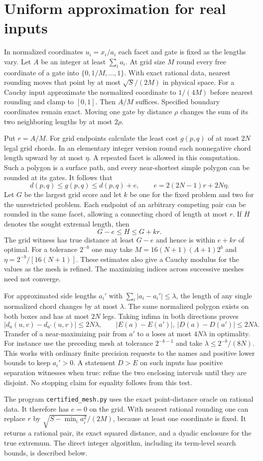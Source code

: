 \documentclass[10pt,letterpaper]{article}
\begin{document}
\section{Uniform approximation for real inputs}\label{sec:precision}
In normalized coordinates $u_i=x_i/a_i$ each facet and gate is fixed as the lengths vary. Let $A$ be an integer at least $\sum_i a_i$. At grid size $M$ round every free coordinate of a gate into $\{0,1/M,\ldots,1\}$. With exact rational data, nearest rounding moves that point by at most $\sqrt S/(2M)$ in physical space. For a Cauchy input approximate the normalized coordinate to $1/(4M)$ before nearest rounding and clamp to $[0,1]$. Then $A/M$ suffices. Specified boundary coordinates remain exact. Moving one gate by distance $\rho$ changes the sum of its two neighboring lengths by at most $2\rho$.
\par Put $r=A/M$. For grid endpoints calculate the least cost $g(p,q)$ of at most $2N$ legal grid chords. In an elementary integer version round each nonnegative chord length upward by at most $\eta$. A repeated facet is allowed in this computation. Such a polygon is a surface path, and every near-shortest simple polygon can be rounded at its gates. It follows that
\[
 d(p,q)\le g(p,q)\le d(p,q)+e,\qquad e=2(2N-1)r+2N\eta .
\]
Let $G$ be the largest grid score and let $k$ be one for the fixed problem and two for the unrestricted problem. Each endpoint of an arbitrary competing pair can be rounded in the same facet, allowing a connecting chord of length at most $r$. If $H$ denotes the sought extremal length, then
\[
             G-e\le H\le G+kr.
\]
The grid witness has true distance at least $G-e$ and hence is within $e+kr$ of optimal. For a tolerance $2^{-b}$ one may take $M=16(N+1)(A+1)2^b$ and $\eta=2^{-b}/[16(N+1)]$. These estimates also give a Cauchy modulus for the values as the mesh is refined. The maximizing indices across successive meshes need not converge.
\par For approximated side lengths $a_i'$ with $\sum_i|a_i-a_i'|\le\lambda$, the length of any single normalized chord changes by at most $\lambda$. The same normalized polygon exists on both boxes and has at most $2N$ legs. Taking infima in both directions proves
\[
 |d_a(u,v)-d_{a'}(u,v)|\le 2N\lambda,
 \qquad |E(a)-E(a')|,\ |D(a)-D(a')|\le 2N\lambda .
\]
Transfer of a near-maximizing pair from $a'$ to $a$ loses at most $4N\lambda$ in optimality. For instance use the preceding mesh at tolerance $2^{-b-1}$ and take $\lambda\le 2^{-b}/(8N)$. This works with ordinary finite precision requests to the names and positive lower bounds to keep $a_i'>0$. A statement $D>E$ on such inputs has positive separation witnesses when true: refine the two enclosing intervals until they are disjoint. No stopping claim for equality follows from this test.
\par The program \texttt{certified\_mesh.py} uses the exact point-distance oracle on rational data. It therefore has $e=0$ on the grid. With nearest rational rounding one can replace $r$ by $\sqrt{S-\min_i a_i^2}/(2M)$, because at least one coordinate is fixed. It returns a rational pair, its exact squared distance, and a dyadic enclosure for the true extremum. The direct integer algorithm, including its term-level search bounds, is described below.
\end{document}
